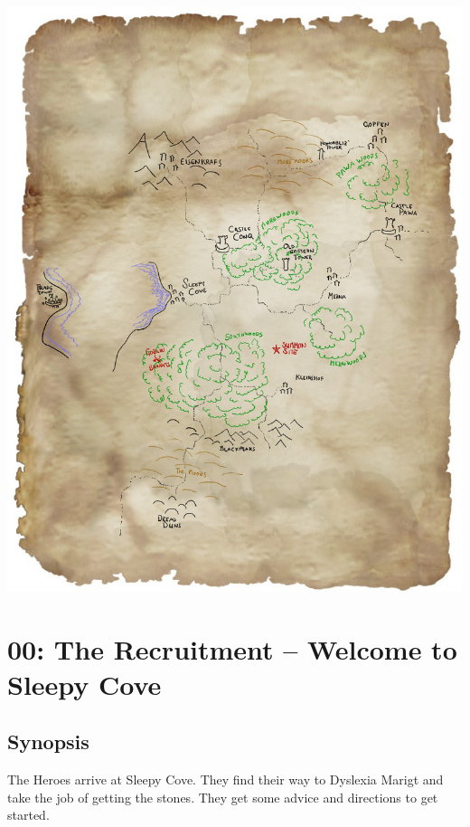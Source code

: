 \begin{center}
\vspace{1 cm}
\includegraphics[width=1.0\linewidth]{./maps/region-gm.jpg}
\end{center}










\clearpage
{}
\section*{00: The Recruitment -- Welcome to Sleepy Cove}


\subsection*{Synopsis}
The Heroes arrive at Sleepy Cove. They find their way to Dyslexia Marigt and take the job of getting the stones. They get some advice and directions to get started.


